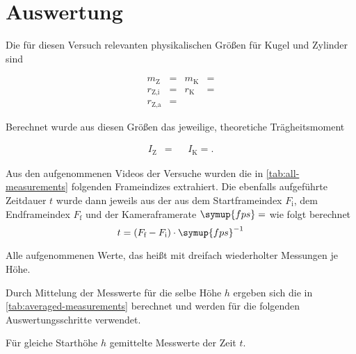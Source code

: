 \section{Auswertung}
\label{sec:Auswertung}


Die für diesen Versuch relevanten physikalischen Größen für Kugel und Zylinder sind 

\begin{align}
  \label{eq:physical-properties}
  m_\text{Z} &=  & m_\text{K} &= \nonumber\\
  r_{\text{Z},\text{i}} &=  & r_\text{K} &= \\
  r_{\text{Z},\text{a}} &=  &&\nonumber
\end{align}

Berechnet wurde aus diesen Größen das jeweilige, theoretiche Trägheitsmoment

\begin{align}
  \label{eq:moments-inertia}
  I_\text{Z} &=  && I_\text{K} = .
\end{align}



Aus den aufgenommenen Videos der Versuche wurden die in \autoref{tab:all-measurements} folgenden Frameindizes extrahiert.
Die ebenfalls aufgeführte Zeitdauer $t$ wurde dann jeweils aus der aus dem Startframeindex $F_\text{i}$,
dem Endframeindex $F_\text{f}$ und der Kameraframerate $\symup{fps}=$ wie folgt 
berechnet
\begin{equation*}
  t = (F_\text{f} - F_\text{i})\cdot\symup{fps}^{-1}
\end{equation*}

\begin{table}
  \centering
  
  \caption{Alle aufgenommenen Werte, das heißt mit dreifach wiederholter Messungen je Höhe.}
  \label{tab:all-measurements}
\end{table}

Durch Mittelung der Messwerte für die selbe Höhe $h$ ergeben sich die in 
\autoref{tab:averaged-measurements} berechnet und werden für die folgenden
Auswertungsschritte verwendet.


\begin{table}
  \centering
  
  \caption{Für gleiche Starthöhe $h$ gemittelte Messwerte der Zeit $t$.}
  \label{tab:averaged-measurements}
\end{table}


